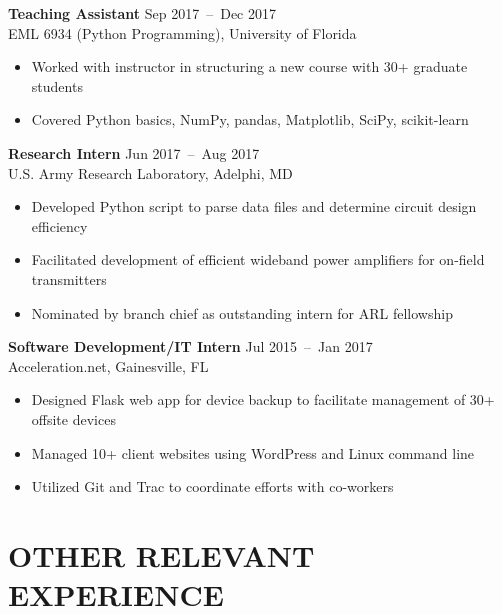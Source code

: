 \documentclass[line,resmargin]{res}
\begin{document}
\begin{resume}
    \textbf{Teaching Assistant}    \hfill Sep 2017~--~Dec 2017 \\
    EML 6934 (Python Programming), University of Florida
    \begin{itemize}  \itemsep -2pt
        \item Worked with instructor in structuring a new course with 30+ graduate students
        \item Covered Python basics, NumPy, pandas, Matplotlib, SciPy, scikit-learn
    \end{itemize}

    \textbf{Research Intern}    \hfill Jun 2017~--~Aug 2017 \\
    U.S. Army Research Laboratory, Adelphi, MD
    \begin{itemize}  \itemsep -2pt
        \item Developed Python script to parse data files and determine circuit design efficiency
        \item Facilitated development of efficient wideband power amplifiers for on-field transmitters
        \item Nominated by branch chief as outstanding intern for ARL fellowship
    \end{itemize}

    \textbf{Software Development/IT Intern}    \hfill Jul 2015~--~Jan 2017 \\
    Acceleration.net, Gainesville, FL
    \begin{itemize}  \itemsep -2pt
        \item Designed Flask web app for device backup to facilitate management of 30+ offsite devices
        \item Managed 10+ client websites using WordPress and Linux command line
        \item Utilized Git and Trac to coordinate efforts with co-workers
    \end{itemize}

\section{OTHER RELEVANT EXPERIENCE}


\end{resume}
\end{document}
